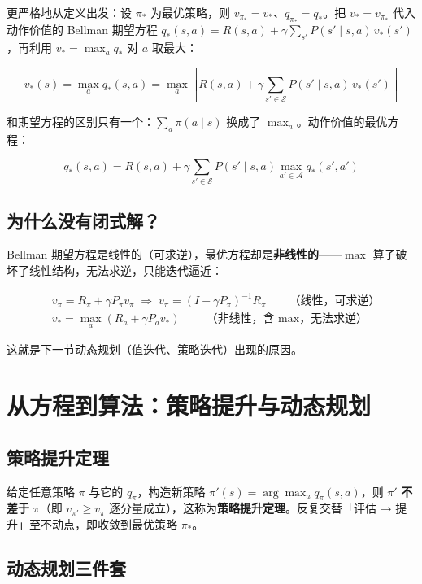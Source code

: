 \documentclass{article}
\begin{document}
更严格地从定义出发：设 $\pi_*$ 为最优策略，则 $v_{\pi_*}=v_*$、$q_{\pi_*}=q_*$。把 $v_* = v_{\pi_*}$ 代入动作价值的 Bellman 期望方程 $q_*(s,a) = R(s,a) + \gamma\sum_{s'}P(s'\mid s,a)\,v_*(s')$，再利用 $v_* = \max_a q_*$ 对 $a$ 取最大：

\[
v_*(s) = \max_a q_*(s,a) = \max_a \left[ R(s,a) + \gamma \sum_{s'\in\mathcal{S}} P(s'\mid s,a)\, v_*(s') \right]
\]

和期望方程的区别只有一个：$\sum_a \pi(a\mid s)$ 换成了 $\max_a$。动作价值的最优方程：

\[
q_*(s,a) = R(s,a) + \gamma \sum_{s'\in\mathcal{S}} P(s'\mid s,a) \max_{a'\in\mathcal{A}} q_*(s',a')
\]

\subsection*{为什么没有闭式解？}

Bellman 期望方程是线性的（可求逆），最优方程却是\textbf{非线性的}——$\max$ 算子破坏了线性结构，无法求逆，只能迭代逼近：

\[
\begin{aligned}
&v_\pi = R_\pi + \gamma P_\pi v_\pi \;\Longrightarrow\; v_\pi = (I-\gamma P_\pi)^{-1}R_\pi \qquad \text{（线性，可求逆）}\\
&v_* = \max_a \left(R_a + \gamma P_a v_*\right) \qquad \text{（非线性，含 $\max$，无法求逆）}
\end{aligned}
\]

这就是下一节动态规划（值迭代、策略迭代）出现的原因。

\section*{从方程到算法：策略提升与动态规划}

\subsection*{策略提升定理}

给定任意策略 $\pi$ 与它的 $q_\pi$，构造新策略 $\pi'(s) = \arg\max_a q_\pi(s,a)$，则 $\pi'$ \textbf{不差于} $\pi$（即 $v_{\pi'} \ge v_\pi$ 逐分量成立），这称为\textbf{策略提升定理}。反复交替「评估 → 提升」至不动点，即收敛到最优策略 $\pi_*$。

\subsection*{动态规划三件套}
\end{document}
